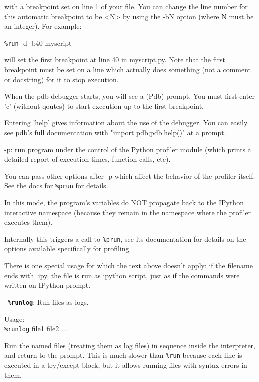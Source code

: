         with a breakpoint set on line 1 of your file.  You can change the line
        number for this automatic breakpoint to be <N> by using the -bN option
        (where N must be an integer).  For example:

          \texttt{\%run} -d -b40 myscript

        will set the first breakpoint at line 40 in myscript.py.  Note that
        the first breakpoint must be set on a line which actually does
        something (not a comment or docstring) for it to stop execution.

        When the pdb debugger starts, you will see a (Pdb) prompt.  You must
        first enter 'c' (without qoutes) to start execution up to the first
        breakpoint.

        Entering 'help' gives information about the use of the debugger.  You
        can easily see pdb's full documentation with "import pdb;pdb.help()"
        at a prompt.

        -p: run program under the control of the Python profiler module (which
        prints a detailed report of execution times, function calls, etc).

        You can pass other options after -p which affect the behavior of the
        profiler itself. See the docs for \texttt{\%prun} for details.

        In this mode, the program's variables do NOT propagate back to the
        IPython interactive namespace (because they remain in the namespace
        where the profiler executes them).

        Internally this triggers a call to \texttt{\%prun}, see its documentation for
        details on the options available specifically for profiling.

        There is one special usage for which the text above doesn't apply:
        if the filename ends with .ipy, the file is run as ipython script,
        just as if the commands were written on IPython prompt.
        

\bigskip
\texttt{\textbf{ \%runlog}}:
	Run files as logs.

        Usage:\\
          \texttt{\%runlog} file1 file2 ...

        Run the named files (treating them as log files) in sequence inside
        the interpreter, and return to the prompt.  This is much slower than
        \texttt{\%run} because each line is executed in a try/except block, but it
        allows running files with syntax errors in them.

